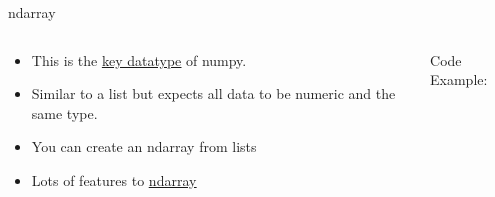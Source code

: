 % 
% 
% 
\begin{Slide}{ndarray}
  \begin{columns}
    \begin{column}{.48\textwidth}
      
      \begin{itemize}

      \item This is the \underline{\href{https://numpy.org/doc/stable/reference/generated/numpy.ndarray.html}{key datatype}} of numpy.
      \item Similar to a list but expects all data to be numeric and the same type.
      \item You can create an ndarray from lists 
      \item Lots of features to \underline{\href{https://numpy.org/devdocs/user/basics.creation.html}{ndarray}}
        
      \end{itemize}
      
      
    \end{column}

    \hfill

    \begin{column}{.48\textwidth}
      Code Example:
      
    \inputminted[firstline=3,
      lastline=19,
      breaklines,
      fontsize=\tiny,
      bgcolor=Background,
      linenos]{python}{../src/ndexample.py}
      
      
    \end{column}
  \end{columns}

\end{Slide}


